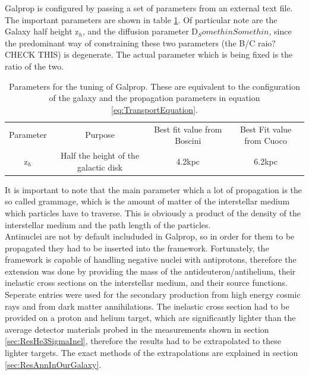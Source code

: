 Galprop is configured by passing a set of parameters from an external text file. The important parameters are shown in table \ref{tab:GalpropParameters}. Of particular note are the Galaxy half height z$_h$, and the diffusion parameter D$_SomethinSomethin$, since the predominant way of constraining these two parameters (the B/C raio? CHECK THIS) is degenerate. The actual parameter which is being fixed is the ratio of the two. \\


\begin{table}[h]
    \centering
    \begin{tabular}{|c|c|c|c|}
        \hline
        Parameter & Purpose & Best fit value from Boscini & Best Fit value from Cuoco \\
        z$_h$ & Half the height of the galactic disk & 4.2kpc & 6.2kpc \\
        \hline
    \end{tabular}
    \caption{Parameters for the tuning of Galprop. These are equivalent to the configuration of the galaxy and the propagation parameters in equation \ref{eq:TransportEquation}.}
    \label{tab:GalpropParameters}
\end{table}

It is important to note that the main parameter which a lot of propagation is the so called grammage, which is the amount of matter of the interstellar medium which particles have to traverse. This is obviously a product of the density of the interstellar medium and the path length of the particles. \\

Antinuclei are not by default includuded in Galprop, so in order for them to be propagated they had to be inserted into the framework. Fortunately, the framework is capable of handling negative nuclei with antiprotons, therefore the extension was done by providing the mass of the antideuteron/antihelium, their inelastic cross sections on the interstellar medium, and their source functions. Seperate entries were used for the secondary production from high energy cosmic rays and from dark matter annihilations. The inelastic cross section had to be provided on a proton and helium target, which are significantly lighter than the average detector materials probed in the measurements shown in section \ref{sec:ResHe3SigmaInel}, therefore the results had to be extrapolated to these lighter targets. The exact methods of the extrapolations are explained in section \ref{sec:ResAnnInOurGalaxy}.\\

